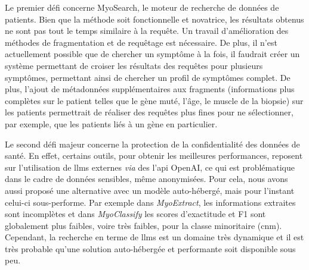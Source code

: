 Le premier défi concerne MyoSearch, le moteur de recherche de données de patients. Bien que la méthode soit fonctionnelle et novatrice, les résultats obtenus ne sont pas tout le temps similaire à la requête. Un travail d'amélioration des méthodes de fragmentation et de requêtage est nécessaire. De plus, il n'est actuellement possible que de chercher un symptôme à la fois, il faudrait créer un système permettant de croiser les résultats des requêtes pour plusieurs symptômes, permettant ainsi de chercher un profil de symptômes complet. De plus, l'ajout de métadonnées supplémentaires aux fragments (informations plus complètes sur le patient telles que le gène muté, l'âge, le muscle de la biopsie) sur les patients permettrait de réaliser des requêtes plus fines pour ne sélectionner, par exemple, que les patients liés à un gène en particulier.

Le second défi majeur concerne la protection de la confidentialité des données de santé. En effet, certains outils, pour obtenir les meilleures performances, reposent sur l'utilisation de \gls{llms} externes \textit{via} des l'\gls{api} OpenAI, ce qui est problématique dans le cadre de données sensibles, même anonymisées. Pour cela, nous avons aussi proposé une alternative avec un modèle auto-hébergé, mais pour l'instant celui-ci sous-performe. Par exemple dans \textit{MyoExtract}, les informations extraites sont incomplètes et dans \textit{MyoClassify} les scores d'exactitude et F1 sont globalement plus faibles, voire très faibles, pour la classe minoritaire (\gls{cnm}). Cependant, la recherche en terme de \gls{llms} est un domaine très dynamique et il est très probable qu'une solution auto-hébergée et performante soit disponible sous peu.